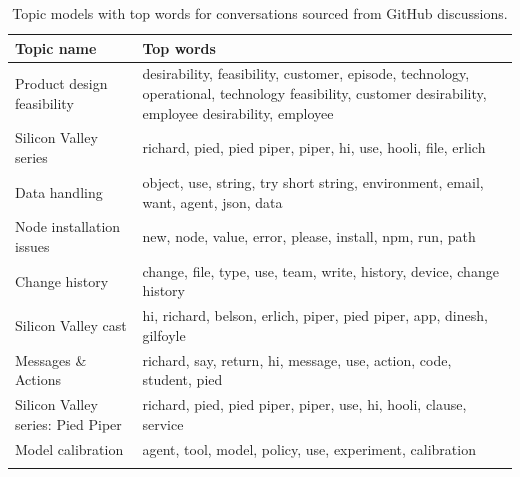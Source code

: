 \begin{longtable}{|m{4cm}|m{8cm}|}
    \hline
    \textbf{Topic name} & \textbf{Top words}  \\
    \hline
    \hline
        Product design feasibility & desirability, feasibility, customer, episode, technology, operational, technology feasibility, customer desirability, employee desirability, employee \\
    \hline
        Silicon Valley series & richard, pied, pied piper, piper, hi, use, hooli, file, erlich \\
    \hline
        Data handling & object, use, string, try short string, environment, email, want, agent, json, data \\
    \hline
        Node installation issues & new, node, value, error, please, install, npm, run, path \\
    \hline
        Change history & change, file, type, use, team, write, history, device, change history \\
    \hline
        Silicon Valley cast & hi, richard, belson, erlich, piper, pied piper, app, dinesh, gilfoyle \\
    \hline
        Messages \& Actions & richard, say, return, hi, message, use, action, code, student, pied \\
    \hline
        Silicon Valley series: Pied Piper & richard, pied, pied piper, piper, use, hi, hooli, clause, service \\
    \hline
        Model calibration & agent, tool, model, policy, use, experiment, calibration \\
    \hline
\caption{Topic models with top words for conversations sourced from GitHub discussions.}\label{table:discussions-topics}
\end{longtable}

